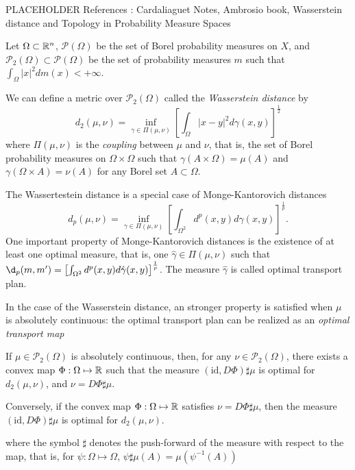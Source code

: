 PLACEHOLDER
References : Cardaliaguet Notes, Ambrosio book, 
Wasserstein distance and Topology in Probability Measure Spaces

Let $\Omega \subset \mathbb{R}^n$, $\mathcal{P}(\Omega)$ be the set of Borel
probability measures on $X$, and $\mathcal{P}_2(\Omega) \subset \mathcal{P}(\Omega)$
be the set of probability measures $m$ such that $\int_\Omega |x|^2 dm(x) < + \infty$.

We can define a metric over $\mathcal{P}_2(\Omega)$ called the 
\textit{Wasserstein distance} by
\begin{equation}\label{prob_measures:wasserstein_distance}
    d_2(\mu, \nu) = \inf_{\gamma \in \Pi(\mu,\nu)} \left[ \int_\Omega |x - y|^2 d\gamma(x,y) \right]^{\frac{1}{2}}
\end{equation}
where $\Pi(\mu,\nu)$ is the \textit{coupling} between $\mu$  and $\nu$,
that is, the set of Borel probability measures on $\Omega \times \Omega$
such that $\gamma(A \times \Omega) = \mu(A)$ and $\gamma(\Omega \times A) = \nu(A)$
for any Borel set $A \subset \Omega$.

The Wassertestein distance is a special case of Monge-Kantorovich distances
\begin{equation*}
    d_p(\mu, \nu) = \inf_{\gamma \in \Pi(\mu, \nu)} \left[ \int_{\Omega^2} d^p(x,y) d\gamma(x,y)  \right]^{\frac{1}{p}}.
\end{equation*}
One important property of Monge-Kantorovich distances is the existence of at least
one optimal measure, that is, one $\hat  \gamma \in \Pi(\mu,\nu)$ such that
$\d_p(m,m') = \left[ \int_{\Omega^2} d^p(x,y) d {\hat \gamma}(x,y) \right]^{\frac{1}{p}}$.
The measure $\hat \gamma$ is called optimal transport plan.

In the case of the Wasserstein distance, an stronger property is satisfied when 
$\mu$ is absolutely continuous: the optimal transport plan can be realized as
an \textit{optimal transport map}
\begin{theorem}
    If $\mu \in \mathcal{P}_2(\Omega)$ is absolutely continuous, then,
    for any $\nu \in \mathcal{P}_2(\Omega)$, there exists a convex map 
    $\Phi: \Omega \mapsto \mathbb{R} $ such that the measure
    $ (\text{id}, D\Phi)\sharp \mu $ is optimal for $d_2(\mu, \nu)$, and $\nu = D \Phi \sharp \mu$.

    Conversely, if the convex map $\Phi : \Omega \mapsto \mathbb{R}$ satisfies $\nu = D \Phi \sharp \mu$,
    then the measure $(\text{id}, D\Phi)\sharp \mu$ is optimal for $d_ 2(\mu,\nu)$.
\end{theorem}
where the symbol $\sharp$ denotes the push-forward of the measure with respect to the map,
that is, for $\psi : \Omega \mapsto \Omega$, $\psi \sharp \mu(A) = \mu(\psi^{-1}(A))$


